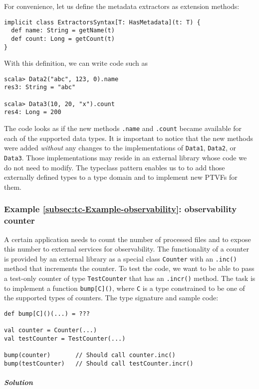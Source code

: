 For convenience, let us define the metadata extractors as extension
methods:
\begin{lstlisting}
implicit class ExtractorsSyntax[T: HasMetadata](t: T) {
  def name: String = getName(t)
  def count: Long = getCount(t)
}
\end{lstlisting}
With this definition, we can write code such as
\begin{lstlisting}
scala> Data2("abc", 123, 0).name
res3: String = "abc"

scala> Data3(10, 20, "x").count
res4: Long = 200
\end{lstlisting}
The code looks as if the new methods \lstinline!.name! and \lstinline!.count!
became available for each of the supported data types. It is important
to notice that the new methods were added \emph{without} any changes
to the implementations of \lstinline!Data1!, \lstinline!Data2!,
or \lstinline!Data3!. Those implementations may reside in an external
library whose code we do not need to modify. The typeclass pattern
enables us to to add those externally defined types to a type domain
and to implement new PTVFs for them.

\subsubsection{Example \label{subsec:tc-Example-observability}\ref{subsec:tc-Example-observability}:
observability counter}

A certain application needs to count the number of processed files
and to expose this number to external services for observability.
The functionality of a counter is provided by an external library
as a special class \lstinline!Counter! with an \lstinline!.inc()!
method that increments the counter. To test the code, we want to be
able to pass a test-only counter of type \lstinline!TestCounter!
that has an \lstinline!.incr()! method. The task is to implement
a function \lstinline!bump[C]()!, where \lstinline!C! is a type
constrained to be one of the supported types of counters. The type
signature and sample code:
\begin{lstlisting}
def bump[C]()(...) = ???

val counter = Counter(...)
val testCounter = TestCounter(...)

bump(counter)       // Should call counter.inc()
bump(testCounter)   // Should call testCounter.incr()
\end{lstlisting}


\subparagraph{Solution}

